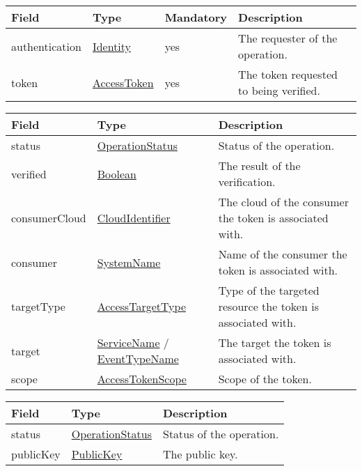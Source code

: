 \documentclass[a4paper]{arrowhead}
\newcommand{\pref}[1]{{\textcolor{ArrowheadGrey}{\hyperref[sec:model:primitives:#1]{#1}}}}
\begin{document}
\begin{table}[ht!]
\begin{tabularx}{\textwidth}{| p{3cm} | p{4.5cm} | p{2cm} | X |} \hline
\rowcolor{gray!33} Field & Type & Mandatory & Description \\ \hline
authentication & \hyperref[sec:model:Identity]{Identity} & yes & The requester of the operation. \\ \hline
token & \pref{AccessToken} & yes & The token requested to being verified. \\ \hline
\end{tabularx}
\end{table}


\begin{table}[ht!]
\begin{tabularx}{\textwidth}{| p{4.25cm} | p{4.5cm} | X |} \hline
\rowcolor{gray!33} Field & Type & Description \\ \hline
status & \pref{OperationStatus} & Status of the operation. \\ \hline
verified & \pref{Boolean} & The result of the verification. \\ \hline
consumerCloud & \pref{CloudIdentifier} & The cloud of the consumer the token is associated with. \\ \hline
consumer & \pref{SystemName} & Name of the consumer the token is associated with. \\ \hline
targetType & \pref{AccessTargetType} & Type of the targeted resource the token is associated with. \\ \hline
target & \pref{ServiceName} / \pref{EventTypeName} & The target the token is associated with. \\ \hline
scope & \hyperref[sec:model:AccessTokenScope]{AccessTokenScope} & Scope of the token. \\ \hline
\end{tabularx}
\end{table}


\begin{table}[ht!]
\begin{tabularx}{\textwidth}{| p{4.25cm} | p{4.5cm} | X |} \hline
\rowcolor{gray!33} Field & Type & Description \\ \hline
status & \pref{OperationStatus} & Status of the operation. \\ \hline
publicKey & \pref{PublicKey} & The public key. \\ \hline
\end{tabularx}
\end{table}
\end{document}

